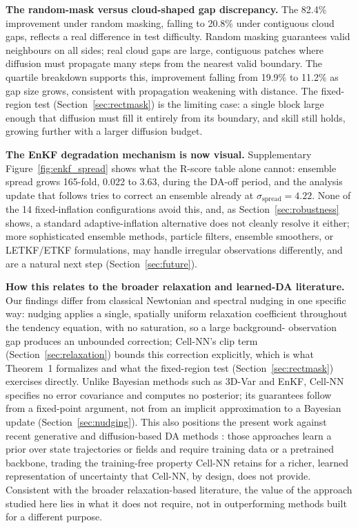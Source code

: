 \documentclass[final,5p,times,twocolumn,authoryear]{elsarticle}
\begin{document}
\textbf{The random-mask versus cloud-shaped gap discrepancy.} The
82.4\% improvement under random masking, falling to 20.8\% under
contiguous cloud gaps, reflects a real difference in test difficulty.
Random masking guarantees valid neighbours on all sides; real cloud
gaps are large, contiguous patches where diffusion must propagate
many steps from the nearest valid boundary. The quartile breakdown
supports this, improvement falling from 19.9\% to 11.2\% as gap size
grows, consistent with propagation weakening with distance. The
fixed-region test (Section~\ref{sec:rectmask}) is the limiting case:
a single block large enough that diffusion must fill it entirely from
its boundary, and skill still holds, growing further with a larger
diffusion budget.

\textbf{The EnKF degradation mechanism is now visual.} Supplementary
Figure~\ref{fig:enkf_spread} shows what the R-score table alone
cannot: ensemble spread grows 165-fold, 0.022 to 3.63, during the
DA-off period, and the analysis update that follows tries to correct
an ensemble already at $\sigma_\text{spread}=4.22$. None of the 14
fixed-inflation configurations avoid this, and, as
Section~\ref{sec:robustness} shows, a standard adaptive-inflation
alternative does not cleanly resolve it either; more sophisticated
ensemble methods, particle filters, ensemble smoothers, or LETKF/ETKF
formulations, may handle irregular observations differently, and are
a natural next step (Section~\ref{sec:future}).

\textbf{How this relates to the broader relaxation and learned-DA
literature.} Our findings differ from classical Newtonian and
spectral nudging \citep{kalnay2003} in one specific way: nudging
applies a single, spatially uniform relaxation coefficient throughout
the tendency equation, with no saturation, so a large background-
observation gap produces an unbounded correction; Cell-NN's clip term
(Section~\ref{sec:relaxation}) bounds this correction explicitly,
which is what Theorem~1 formalizes and what the fixed-region test
(Section~\ref{sec:rectmask}) exercises directly. Unlike Bayesian
methods such as 3D-Var and EnKF, Cell-NN specifies no error
covariance and computes no posterior; its guarantees follow from a
fixed-point argument, not from an implicit approximation to a
Bayesian update (Section~\ref{sec:nudging}). This also positions the
present work against recent generative and diffusion-based DA
methods \citep{rozet2023score,huang2024diffda,manshausen2025generative}:
those approaches learn a prior over state trajectories or fields and
require training data or a pretrained backbone, trading the
training-free property Cell-NN retains for a richer, learned
representation of uncertainty that Cell-NN, by design, does not
provide. Consistent with the broader relaxation-based literature, the
value of the approach studied here lies in what it does not require,
not in outperforming methods built for a different purpose.
\end{document}
